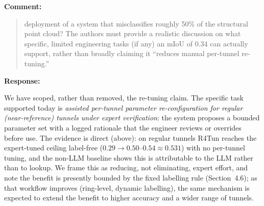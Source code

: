 \documentclass[11pt,a4paper]{article}
\newenvironment{commentblock}{%
  \par\smallskip\noindent\textbf{Comment:}\par
  \begin{quote}\itshape\color{black}
}{%
  \end{quote}\smallskip
}
\newenvironment{responseblock}{%
  \par\smallskip\noindent\textbf{Response:}\par
  \begingroup\color{responsegreen}
}{%
  \endgroup\smallskip
}
\begin{document}
\begin{commentblock}
deployment of a system that misclassifies roughly 50\% of the structural point cloud? The authors must provide a realistic discussion on what specific, limited engineering tasks (if any) an mIoU of 0.34 can actually support, rather than broadly claiming it ``reduces manual per-tunnel re-tuning.''
\end{commentblock}

\begin{responseblock}
We have scoped, rather than removed, the re-tuning claim. The specific task supported today is \emph{assisted per-tunnel parameter re-configuration for regular (near-reference) tunnels under expert verification}: the system proposes a bounded parameter set with a logged rationale that the engineer reviews or overrides before use. The evidence is direct (above): on regular tunnels R4Tun reaches the expert-tuned ceiling label-free ($0.29 \rightarrow 0.50$--$0.54 \approx 0.531$) with no per-tunnel tuning, and the non-LLM baseline shows this is attributable to the LLM rather than to lookup. We frame this as reducing, not eliminating, expert effort, and note the benefit is presently bounded by the fixed labelling rule (Section~4.6); as that workflow improves (ring-level, dynamic labelling), the same mechanism is expected to extend the benefit to higher accuracy and a wider range of tunnels.
\end{responseblock}
\end{document}
